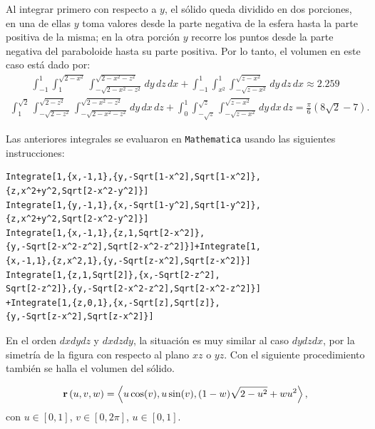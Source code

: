 Al integrar primero con respecto a $y$, el sólido queda dividido en dos porciones, en una de ellas $y$ toma valores desde la parte negativa de la esfera hasta la parte positiva de la misma; en la otra porción $y$ recorre los puntos desde la parte negativa del paraboloide hasta su parte positiva.
Por lo tanto, el volumen en este caso está dado por:
\begin{gather*}
\int_{-1}^{1} \int_{1}^{\sqrt{2 - x^2}} \int_{-\sqrt{2 - x^2 - z^2}}^{\sqrt{2 - x^2 - z^2}} dy\, dz\, dx
+ \int_{-1}^{1} \int_{x^2}^{1} \int_{-\sqrt{z - x^2}}^{\sqrt{z - x^2}} dy\, dz\, dx
\approx 2.259
\end{gather*}
\begin{gather*}
\int_{1}^{\sqrt{2}} \int_{-\sqrt{2 - z^2}}^{\sqrt{2 - z^2}} \int_{-\sqrt{2 - x^2 - z^2}}^{\sqrt{2 - x^2 - z^2}} dy\, dx\, dz
+ \int_{0}^{1} \int_{-\sqrt{z}}^{\sqrt{z}} \int_{-\sqrt{z - x^2}}^{\sqrt{z - x^2}} dy\, dx\, dz
= \frac{\pi}{6}(8\sqrt{2} - 7).
\end{gather*}

Las anteriores integrales se evaluaron en \verb"Mathematica" usando las si\-guientes instrucciones:

\begin{tcolorbox}[title=\bf Instrucción en \verb"Mathematica"]\begin{Verbatim}[formatcom=\letraverbatim]
Integrate[1,{x,-1,1},{y,-Sqrt[1-x^2],Sqrt[1-x^2]},
{z,x^2+y^2,Sqrt[2-x^2-y^2]}]
Integrate[1,{y,-1,1},{x,-Sqrt[1-y^2],Sqrt[1-y^2]},
{z,x^2+y^2,Sqrt[2-x^2-y^2]}]
Integrate[1,{x,-1,1},{z,1,Sqrt[2-x^2]},
{y,-Sqrt[2-x^2-z^2],Sqrt[2-x^2-z^2]}]+Integrate[1,
{x,-1,1},{z,x^2,1},{y,-Sqrt[z-x^2],Sqrt[z-x^2]}]
Integrate[1,{z,1,Sqrt[2]},{x,-Sqrt[2-z^2],
Sqrt[2-z^2]},{y,-Sqrt[2-x^2-z^2],Sqrt[2-x^2-z^2]}]
+Integrate[1,{z,0,1},{x,-Sqrt[z],Sqrt[z]},
{y,-Sqrt[z-x^2],Sqrt[z-x^2]}]
\end{Verbatim}
\end{tcolorbox}

En el orden $dxdydz$ y $dxdzdy$, la situación es muy similar al caso $dydzdx$,
por la simetría de la figura con respecto al plano
$xz$ o $yz$. Con el siguiente procedimiento también se halla el volumen del sólido.

\begin{gather*}
{\bf r}\left( u,v,w\right) = \left\langle u\cos (v) ,u\sin(v),(1-w) \sqrt{2-u^2}+wu^2\right\rangle,
\end{gather*}
con $u\in [0,1]$, $v\in [0,2\pi ]$, $u\in [0,1]$.


